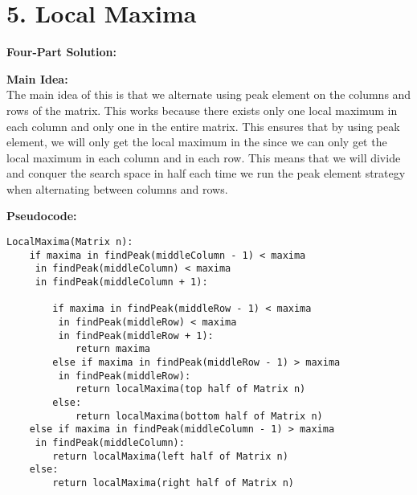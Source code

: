 \documentclass[11pt]{article}
\newenvironment{FourPartSolution}{\par{\bf Four-Part Solution:}}{\smallskip}
\newenvironment{mainIdea}{\par{\bf Main Idea:}}{\smallskip}
\newenvironment{pseudocode}{\par{\bf Pseudocode:}}{\smallskip}
\begin{document}
\section*{5. Local Maxima}
\begin{FourPartSolution}
\begin{mainIdea}
\\
The main idea of this is that we alternate using peak element on the columns and rows of the matrix. This works because there exists only one local maximum in each column and only one in the entire matrix. This ensures that by using peak element, we will only get the local maximum in the since we can only get the local maximum in each column and in each row. This means that we will divide and conquer the search space in half each time we run the peak element strategy when alternating between columns and rows.
\end{mainIdea}
\\
\begin{pseudocode}
\\
\begin{lstlisting}
LocalMaxima(Matrix n):
	if maxima in findPeak(middleColumn - 1) < maxima
	 in findPeak(middleColumn) < maxima
	 in findPeak(middleColumn + 1):

		if maxima in findPeak(middleRow - 1) < maxima
		 in findPeak(middleRow) < maxima
		 in findPeak(middleRow + 1):
			return maxima
		else if maxima in findPeak(middleRow - 1) > maxima
		 in findPeak(middleRow):
			return localMaxima(top half of Matrix n)
		else:
			return localMaxima(bottom half of Matrix n)
	else if maxima in findPeak(middleColumn - 1) > maxima
	 in findPeak(middleColumn):
		return localMaxima(left half of Matrix n)
	else:
		return localMaxima(right half of Matrix n)


\end{lstlisting}
\end{pseudocode}
\end{FourPartSolution}
\end{document}
